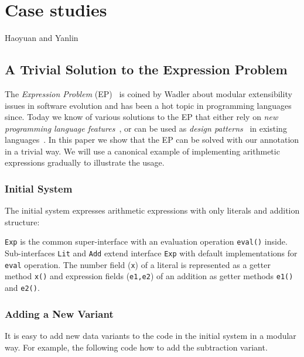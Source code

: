 \section{Case studies}
Haoyuan and Yanlin

\subsection{A Trivial Solution to the Expression Problem}

The \emph{Expression Problem} (EP)~\cite{wadler98expression-problem} is coined
by Wadler about modular extensibility issues in software evolution and has been
a hot topic in programming languages since. Today we know of various solutions
to the EP that either rely on \emph{new programming language
  features}~\cite{chambers95multimethods,clifton00multiJava,madsen89virtual,nystrom06j,bruce98astatically,McDirmid01jiazzi,garrigue98polymorphic,zenger01extensible,loh06open,wehr11javaGI},
or can be used as \emph{design patterns}~\cite{gof} in existing
languages~\cite{torgersen04theexpression,oliveira06extensible,wouter08datatypes,oliveira09modular,oliveira12extensibility}. In
this paper we show that the EP can be solved with our \mixin annotation in a
trivial way. We will use a canonical example of implementing arithmetic
expressions gradually to illustrate the usage. 

\subsubsection{Initial System}
The initial system expresses arithmetic expressions with only literals and
addition structure:


\texttt{Exp} is the common super-interface with an evaluation operation
\texttt{eval()} inside. Sub-interfaces \texttt{Lit} and \texttt{Add} extend
interface \texttt{Exp} with default implementations for \texttt{eval}
operation. The number field (\texttt{x}) of a literal is represented as a getter
method \texttt{x()} and expression fields (\texttt{e1,e2}) of an addition as
getter methods \texttt{e1()} and \texttt{e2()}.

\subsubsection{Adding a New Variant}
It is easy to add new data variants to the code in the initial system in a
modular way. For example, the following code how to add the subtraction variant.

